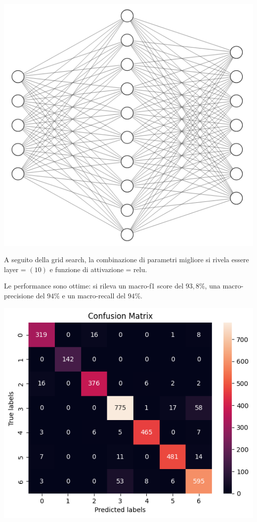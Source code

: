 \begin{Figure}
    \centering
    \includegraphics[width=0.8\linewidth]{img/mlp.png}
\end{Figure}

A seguito della grid search, la combinazione di parametri migliore si rivela essere 
layer = $(10)$ e funzione di attivazione = relu.

Le performance sono ottime: si rileva un macro-f1 score del $93,8\%$, 
una macro-precisione del $94\%$ e un macro-recall del $94\%$.

\begin{Figure}
    \centering
    \includegraphics[width=\linewidth]{img/mlp_low_confusion_matrix.png}
\end{Figure}

